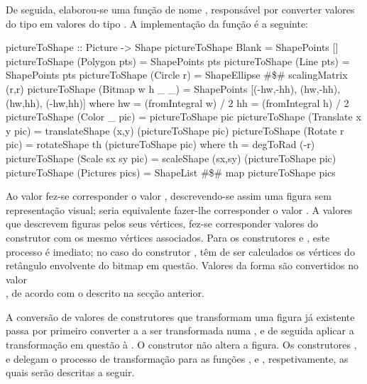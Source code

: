 \documentclass[a4paper]{article}
\begin{document}
\bigskip

De seguida, elaborou-se uma função de nome , responsável por converter valores do tipo  em valores do tipo . A implementação da função é a seguinte:

\begin{haskellblock}
pictureToShape :: Picture -> Shape
pictureToShape Blank               = ShapePoints []
pictureToShape (Polygon pts)       = ShapePoints pts
pictureToShape (Line pts)          = ShapePoints pts
pictureToShape (Circle r)          = ShapeEllipse #\$# scalingMatrix (r,r)
pictureToShape (Bitmap w h _ _)    =
    ShapePoints [(-hw,-hh), (hw,-hh), (hw,hh), (-hw,hh)]
    where
        hw = (fromIntegral w) / 2
        hh = (fromIntegral h) / 2
pictureToShape (Color _ pic)       = pictureToShape pic
pictureToShape (Translate x y pic) = translateShape (x,y) (pictureToShape pic)
pictureToShape (Rotate r pic)      = rotateShape th (pictureToShape pic)
    where th = degToRad (-r)
pictureToShape (Scale sx sy pic)   = scaleShape (sx,sy) (pictureToShape pic)
pictureToShape (Pictures pics)     = ShapeList #\$# map pictureToShape pics
\end{haskellblock}

Ao valor  fez-se corresponder o valor , descrevendo-se assim uma figura sem representação visual; seria equivalente fazer-lhe corresponder o valor . A valores que descrevem figuras pelos seus vértices, fez-se corresponder valores do construtor  com os mesmo vértices associados. Para os construtores  e , este processo é imediato; no caso do construtor , têm de ser calculados os vértices do retângulo envolvente do bitmap em questão. Valores da forma  são convertidos no valor \\, de acordo com o descrito na secção anterior.

A conversão de valores de construtores que transformam uma figura já existente passa por primeiro converter a  a ser transformada numa , e de seguida aplicar a transformação em questão à . O construtor  não altera a figura. Os construtores ,  e  delegam o processo de transformação para as funções ,  e , respetivamente, as quais serão descritas a seguir.
\end{document}
